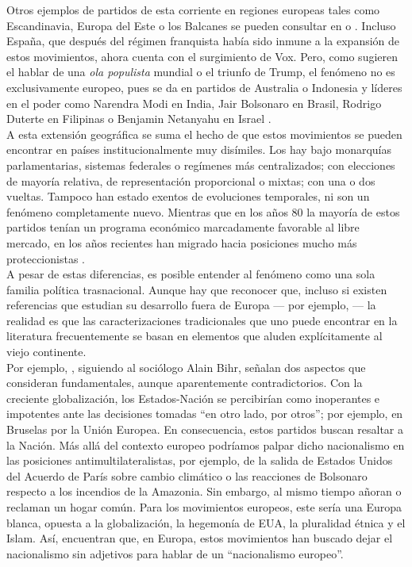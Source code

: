 Otros ejemplos de partidos de esta corriente en regiones europeas tales como Escandinavia, Europa del Este o los Balcanes se pueden consultar en \textcite{Mammone12} o \textcite{Hainsworth16a}. Incluso España, que después del régimen franquista había sido inmune a la expansión de estos movimientos, ahora cuenta con el surgimiento de Vox. Pero, como sugieren el hablar de una \textit{ola populista} mundial o el triunfo de Trump, el fenómeno no es exclusivamente europeo, pues se da en partidos de Australia o Indonesia y líderes en el poder como Narendra Modi en India, Jair Bolsonaro en Brasil, Rodrigo Duterte en Filipinas o Benjamin Netanyahu en Israel \parencite{Mudde19}.\\ 

A esta extensión geográfica se suma el hecho de que estos movimientos se pueden encontrar en países institucionalmente muy disímiles. Los hay bajo monarquías parlamentarias, sistemas federales o regímenes más centralizados; con elecciones de mayoría relativa, de representación proporcional o mixtas; con una o dos vueltas. Tampoco han estado exentos de evoluciones temporales, ni son un fenómeno completamente nuevo. Mientras que en los años 80 la mayoría de estos partidos tenían un programa económico marcadamente favorable al libre mercado, en los años recientes han migrado hacia posiciones mucho más proteccionistas \parencite{Mudde16}.\\ 

A pesar de estas diferencias, es posible entender al fenómeno como una sola familia política trasnacional. Aunque hay que reconocer que, incluso si existen referencias que estudian su desarrollo fuera de Europa --- por ejemplo,  \textcite{CoxDurham16}--- la realidad es que las caracterizaciones tradicionales que uno puede encontrar en la literatura frecuentemente se basan en elementos que aluden explícitamente al viejo continente.\\ 

Por ejemplo, \textcite{Mammone12}, siguiendo al sociólogo Alain Bihr, señalan dos aspectos que consideran fundamentales, aunque aparentemente contradictorios. Con la creciente globalización, los Estados-Nación se percibirían como inoperantes e impotentes ante las decisiones tomadas “en otro lado, por otros”; por ejemplo, en Bruselas por la Unión Europea. En consecuencia, estos partidos buscan resaltar a la Nación. Más allá del contexto europeo podríamos palpar dicho nacionalismo en las posiciones antimultilateralistas, por ejemplo, de la salida de Estados Unidos del Acuerdo de París sobre cambio climático o las reacciones de Bolsonaro respecto a los incendios de la Amazonia. Sin embargo, al mismo tiempo añoran o reclaman un hogar común. Para los movimientos europeos, este sería una Europa blanca, opuesta a la globalización, la hegemonía de EUA, la pluralidad étnica y el Islam. Así, \citeauthor{Mammone12} encuentran que, en Europa, estos movimientos han buscado dejar el nacionalismo sin adjetivos para hablar de un “nacionalismo europeo”.\\ 

